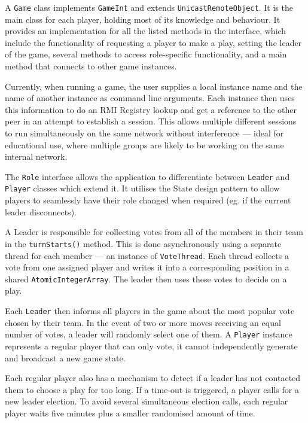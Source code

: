 \documentclass[conference]{IEEEtran}
\begin{document}
A \texttt{Game} class implements \texttt{GameInt} and extends
\texttt{UnicastRemoteObject}. It is the main class for each player,
holding most of its knowledge and behaviour. It provides an
implementation for all the listed methods in the interface, which
include the functionality of requesting a player to make a play,
setting the leader of the game, several methods to access
role-specific functionality, and a main method that connects to other game instances.
 
Currently, when running a game, the user supplies a local instance
name and the name of another instance as command line arguments. Each
instance then uses this information to do an RMI Registry lookup and
get a reference to the other peer in an attempt to establish a
session. This allows multiple different sessions to run simultaneously
on the same network without interference --- ideal for educational use, where multiple groups are likely to be working on the same internal network.

The \texttt{Role} interface allows the application to differentiate between \texttt{Leader} and \texttt{Player} classes which extend it. It utilises the State design pattern to allow players to seamlessly have their role changed when required (eg. if the current leader disconnects).

A Leader is responsible for collecting votes from all of the members
in their team in the \texttt{turnStarts()} method. This is done
asynchronously using a separate thread for each member --- an instance
of \texttt{VoteThread}. Each thread collects a vote from one assigned
player and writes it into a corresponding position in a shared
\texttt{AtomicIntegerArray}. The leader then uses these votes to decide
on a play.

Each \texttt{Leader} then informs all players in the game about the
most popular vote chosen by their team. In the event of two or more
moves receiving an equal number of votes, a leader will randomly
select one of them. A \texttt{Player} instance represents a regular
player that can only vote, it cannot independently generate and
broadcast a new game state.

Each regular player also has a mechanism to detect if a leader has not contacted them to choose a play for too long. If a time-out is triggered, a player calls for a new leader election. To avoid several simultaneous election calls, each regular player waits five minutes plus a smaller randomised amount of time.
\end{document}
